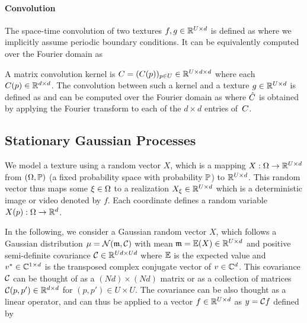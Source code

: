 \paragraph{Convolution}

The space-time convolution of two textures $f,g \in \mathbb{R}^{U \times d}$ is defined as
where we implicitly assume periodic boundary conditions. 
It can be equivalently computed over the Fourier domain as

A matrix convolution kernel is $C = (C(p))_{p \in U} \in \mathbb{R}^{U \times d \times d}$ where each $C(p) \in \mathbb{R}^{d \times d}$. The convolution between such a kernel and a texture $g \in \mathbb{R}^{U \times d}$ is defined as
and can be  computed over the Fourier domain as
where $\hat {C}$ is obtained by applying the Fourier transform to each of the $d \times d$ entries of~$C$.



\subsection{Stationary Gaussian Processes}

We model a texture using a random vector $X$, which is a mapping $X: \Omega \rightarrow \mathbb{R}^{U \times d}$ from $(\Omega,\mathbb{P})$ (a fixed probability space with probability $\mathbb{P}$) to $\mathbb{R}^{U \times d}$. This random vector thus maps some $\xi \in \Omega$ to a realization $X_\xi \in \mathbb{R}^{U \times d}$ which is a deterministic image or video denoted by $f$. Each coordinate defines a random variable $X(p): \Omega \rightarrow \mathbb{R}^d$.

In the following, we consider a Gaussian random vector $X$, which follows a Gaussian distribution $\mu = \mathcal{N}({\frak m}, \mathcal{C})$ with mean ${\frak m} = \mathbb{E}(X) \in \mathbb{R}^{U \times d}$ and  positive semi-definite covariance  $\mathcal{C} \in \mathbb{R}^{U d \times Ud}$
where $\mathbb{E}$ is the expected value and $v^* \in \mathbb{C}^{1 \times d}$ is the transposed complex conjugate vector of $v \in \mathbb{C}^d$. This covariance $\mathcal{C}$ can be thought of as a $(Nd) \times (Nd)$ matrix or as a collection of matrices $\mathcal{C}(p,p') \in \mathbb{R}^{d \times d}$ for $(p,p') \in U \times U$. The covariance can be also thought as a linear operator, and can thus be applied to a vector $f \in \mathbb{R}^{U \times d}$ as $y = \mathcal{C} f$ defined by

